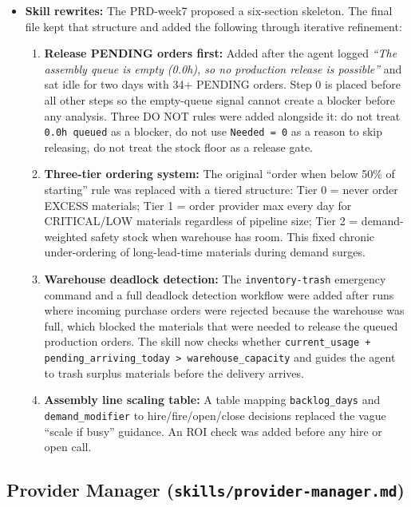 \documentclass[
]{article}
\begin{document}
\begin{itemize}
\item \textbf{Skill rewrites:} The PRD-week7 proposed a six-section skeleton. The final file kept that structure and added the following through iterative refinement:

\begin{enumerate}
    \item \textbf{Release PENDING orders first:} Added after the agent logged \emph{``The assembly queue is empty (0.0h), so no production release is possible''} and sat idle for two days with 34+ PENDING orders. Step 0 is placed before all other steps so the empty-queue signal cannot create a blocker before any analysis. Three DO NOT rules were added alongside it: do not treat \texttt{0.0h queued} as a blocker, do not use \texttt{Needed = 0} as a reason to skip releasing, do not treat the stock floor as a release gate.

    \item \textbf{Three-tier ordering system:} The original ``order when below 50\% of starting'' rule was replaced with a tiered structure: Tier 0 = never order EXCESS materials; Tier 1 = order provider max every day for CRITICAL/LOW materials regardless of pipeline size; Tier 2 = demand-weighted safety stock when warehouse has room. This fixed chronic under-ordering of long-lead-time materials during demand surges.

    \item \textbf{Warehouse deadlock detection:} The \texttt{inventory-trash} emergency command and a full deadlock detection workflow were added after runs where incoming purchase orders were rejected because the warehouse was full, which blocked the materials that were needed to release the queued production orders. The skill now checks whether \texttt{current\_usage + pending\_arriving\_today > warehouse\_capacity} and guides the agent to trash surplus materials before the delivery arrives.

    \item \textbf{Assembly line scaling table:} A table mapping \texttt{backlog\_days} and \texttt{demand\_modifier} to hire/fire/open/close decisions replaced the vague ``scale if busy'' guidance. An ROI check was added before any hire or open call.
\end{enumerate}
\end{itemize}

\subsection{\texorpdfstring{Provider Manager
(\texttt{skills/provider-manager.md})}{Provider Manager (skills/provider-manager.md)}}\label{provider-manager-skillsprovider-manager.md}
\end{document}
